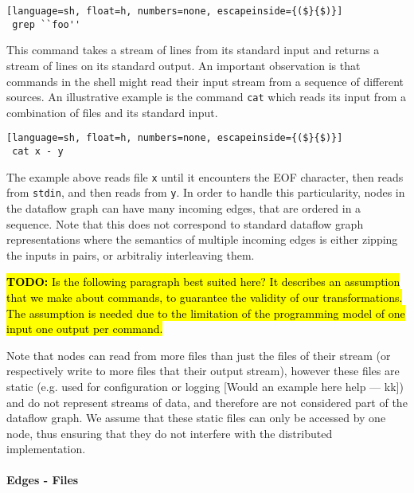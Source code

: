 \documentclass[sigplan,10pt,review,anonymous]{acmart}
\newcommand{\ttt}[1]{\texttt{\small #1}}
\newcommand{\TODO}[1]{\hl{\textbf{TODO:} #1}\xspace}
\newcommand{\kk}[1]{[{\color{magenta}#1 --- kk}]}
\begin{document}
\begin{lstlisting}[language=sh, float=h, numbers=none, escapeinside={($}{$)}]
 grep ``foo''
\end{lstlisting}

\noindent
This command takes a stream of lines from its standard input and
returns a stream of lines on its standard output. An important
observation is that commands in the shell might read their input
stream from a sequence of different sources. An illustrative example
is the command \ttt{cat} which reads its input from a combination
of files and its standard input.

\begin{lstlisting}[language=sh, float=h, numbers=none, escapeinside={($}{$)}]
 cat x - y
\end{lstlisting}

The example above reads file \ttt{x} until it encounters the EOF
character, then reads from \ttt{stdin}, and then reads from
\ttt{y}. In order to handle this particularity, nodes in the
dataflow graph can have many incoming edges, that are ordered in a
sequence. Note that this does not correspond to standard dataflow
graph representations where the semantics of multiple incoming edges
is either zipping the inputs in pairs, or arbitraliy interleaving them.

\TODO{Is the following paragraph best suited here? It describes an
  assumption that we make about commands, to guarantee the validity of
  our transformations. The assumption is needed due to the limitation
  of the programming model of one input one output per command.}

Note that nodes can read from more files than just the files of their
stream (or respectively write to more files that their output stream),
however these files are static (e.g. used for configuration or logging
\kk{Would an example here help}) and do not represent streams of data,
and therefore are not considered part of the dataflow graph. We assume
that these static files can only be accessed by one node, thus
ensuring that they do not interfere with the distributed
implementation.

\paragraph{Edges - Files}
\end{document}
